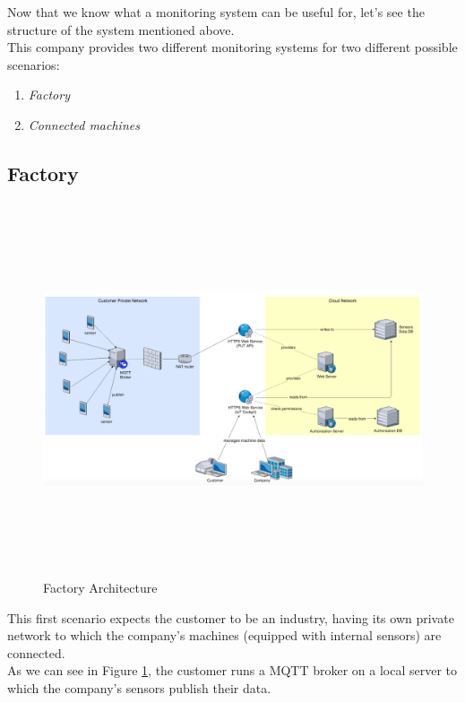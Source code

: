 \documentclass[12pt]{report}
\begin{document}
{{Now that we know what a monitoring system can be useful for, let's see the structure of the system mentioned above.\\

This company provides two different monitoring systems for two different possible scenarios:
\bigskip
\begin{enumerate}
\setlength{\itemindent}{+5mm}
\item \emph{Factory}
\item \emph{Connected machines}
\end{enumerate}

\clearpage
\subsection{Factory}

\begin{figure}[H]
\includegraphics[width=15cm,height=11cm,keepaspectratio]{factory_architecture}
\centering
\caption{Factory Architecture}
\label{fig:factoryarchitecture}
\end{figure}

This first scenario expects the customer to be an industry, having its own private network to which the company's machines (equipped with internal sensors) are connected.\\
As we can see in Figure \ref{fig:factoryarchitecture}, the customer runs a MQTT broker on a local server to which the company's sensors publish their data.\\

}}
\end{document}
